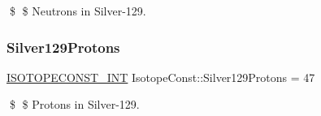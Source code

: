 \$ \$ Neutrons in Silver-\/129. \mbox{\label{group___isotope_const-_silver-_ag129_ga2b751e9f4e14a040cc00c69f4f68adf8}} 
\subsubsection{\texorpdfstring{Silver129\+Protons}{Silver129Protons}}
{\footnotesize\ttfamily \mbox{\hyperlink{group___isotope_const-_macros_ga5f18360b3e99483a35c32d789e62621c}{I\+S\+O\+T\+O\+P\+E\+C\+O\+N\+S\+T\+\_\+\+I\+NT}} Isotope\+Const\+::\+Silver129\+Protons = 47}

\$ \$ Protons in Silver-\/129. 